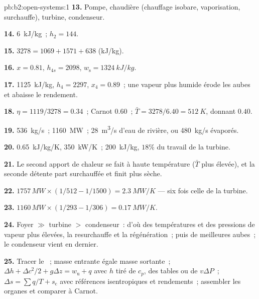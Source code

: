 \begin{solution}{pb:b2:open-systems:1}
\textbf{13.} Pompe, chaudière (chauffage isobare, vaporisation, surchauffe),
turbine, condenseur.

\textbf{14.} \qty{6}{kJ/kg}~; $h_2 = 144$.

\textbf{15.} $3278 = 1069 + 1571 + 638$ (\unit{kJ/kg}).

\textbf{16.} $x = 0.81$, $h_{4s} = 2098$, $w_{\text{s}} = \qty{1324}{kJ/kg}$.

\textbf{17.} \qty{1125}{kJ/kg}, $h_4 = 2297$, $x_4 = 0.89$~; une vapeur plus humide érode les
aubes et abaisse le rendement.

\textbf{18.} $\eta = 1119/3278 = 0.34$~; Carnot $0.60$~; $\bar T = 3278/6.40 =
\qty{512}{K}$, donnant $0.40$.

\textbf{19.} \qty{536}{kg/s}~; \qty{1160}{MW}~; \qty{28}{m^3/s} d'eau de rivière,
ou \qty{480}{kg/s} évaporés.

\textbf{20.} \qty{0.65}{kJ/kg/K}, \qty{350}{kW/K}~; \qty{200}{kJ/kg}, $18\%$ du
travail de la turbine.

\textbf{21.} Le second apport de chaleur se fait à haute température ($\bar T$ plus
élevée), et la seconde détente part surchauffée et finit plus sèche.

\textbf{22.} $1757\,\unit{MW} \times (1/512 - 1/1500) = \qty{2.3}{MW/K}$ --- six fois
celle de la turbine.

\textbf{23.} $1160\,\unit{MW} \times (1/293 - 1/306) = \qty{0.17}{MW/K}$.

\textbf{24.} Foyer $\gg$ turbine $>$ condenseur~: d'où des températures et des
pressions de vapeur plus élevées, la resurchauffe et la régénération~; puis de meilleures
aubes~; le condenseur vient en dernier.

\textbf{25.} Tracer le ~; masse entrante égale masse sortante~; $\Delta h +
\Delta c^2/2 + g\Delta z = w_{\text{u}} + q$ avec $h$ tiré de $c_p$, des tables ou de
$v\Delta P$~; $\Delta s = \sum q/T + s_{\text{c}}$ avec références isentropiques et
rendements~; assembler les organes et comparer à Carnot.
\end{solution}
